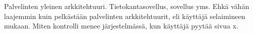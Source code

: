 Palvelinten yleinen arkkitehtuuri. Tietokantasovellus, sovellus yms. Ehkä vähän laajemmin kuin pelkästään palvelinten arkkitehtuurit, eli käyttäjä selaimineen mukaan. Miten kontrolli menee järjestelmässä, kun käyttäjä pyytää sivua x.
